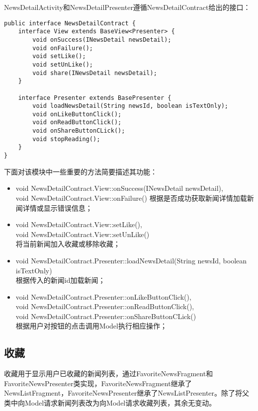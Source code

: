 \documentclass[UTF8]{ctexart}
\begin{document}
		NewsDetailActivity和NewsDetailPresenter遵循NewsDetailContract给出的接口：

\begin{verbatim}
public interface NewsDetailContract {
    interface View extends BaseView<Presenter> {
        void onSuccess(INewsDetail newsDetail);
        void onFailure();
        void setLike();
        void setUnLike();
        void share(INewsDetail newsDetail);
    }

    interface Presenter extends BasePresenter {
        void loadNewsDetail(String newsId, boolean isTextOnly);
        void onLikeButtonClick();
        void onReadButtonClick();
        void onShareButtonCLick();
        void stopReading();
    }
}
\end{verbatim}

		下面对该模块中一些重要的方法简要描述其功能：

		\begin{itemize}
			\item void NewsDetailContract.View::onSuccess(INewsDetail newsDetail),
			\\void NewsDetailContract.View::onFailure()
				根据是否成功获取新闻详情加载新闻详情或显示错误信息；
			\item void NewsDetailContract.View::setLike(),
			\\void NewsDetailContract.View::setUnLike()
		    \\将当前新闻加入收藏或移除收藏；
			\item void NewsDetailContract.Presenter::loadNewsDetail(String newsId, boolean isTextOnly)
			\\根据传入的新闻id加载新闻；
			\item void NewsDetailContract.Presenter::onLikeButtonClick(),
			\\void NewsDetailContract.Presenter::onReadButtonClick(),
			\\void NewsDetailContract.Presenter::onShareButtonCLick()
			\\根据用户对按钮的点击调用Model执行相应操作；
		\end{itemize}

\subsection{收藏}

	收藏用于显示用户已收藏的新闻列表，通过FavoriteNewsFragment和FavoriteNewsPresenter类实现，FavoriteNewsFragment继承了NewsListFragment，FavoriteNewsPresenter继承了NewsListPresenter。除了将父类中向Model请求新闻列表改为向Model请求收藏列表，其余无变动。
\end{document}
